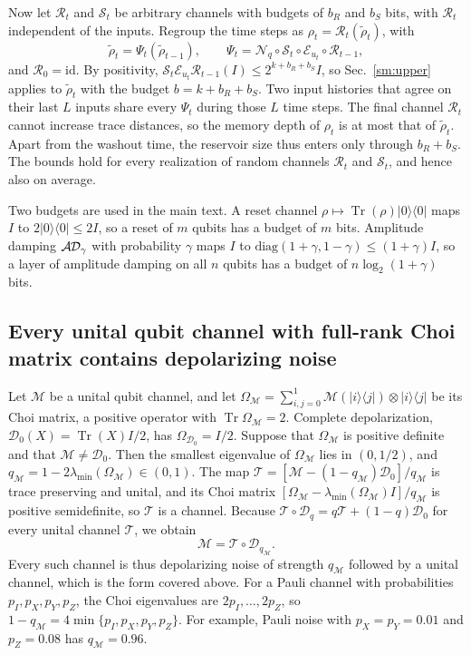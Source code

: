 \documentclass[aps,prl,twocolumn,superscriptaddress,floatfix]{revtex4-2}
\theoremstyle{plain}
\newcommand{\tr}{\operatorname{Tr}}
\newcommand{\ketbra}[2]{|#1\rangle\!\langle #2|}
\newcommand{\cD}{\mathcal D}
\newcommand{\cE}{\mathcal E}
\newcommand{\Nq}{\mathcal N_q}
\newcommand{\AD}{\mathcal{A\hspace{-0.6pt}D}}
\begin{document}
Now let $\mathcal R_t$ and $\mathcal S_t$ be arbitrary channels with budgets of $b_R$ and $b_S$ bits, with $\mathcal R_t$ independent of the inputs. Regroup the time steps as $\rho_t=\mathcal R_t(\tilde\rho_t)$, with
\begin{equation}
\tilde\rho_t=\Psi_t(\tilde\rho_{t-1}),\qquad\Psi_t=\Nq\circ\mathcal S_t\circ\cE_{u_t}\circ\mathcal R_{t-1},
\end{equation}
and $\mathcal R_0=\mathrm{id}$. By positivity, $\mathcal S_t\cE_{u_t}\mathcal R_{t-1}(I)\le2^{k+b_R+b_S}I$, so Sec.~\ref{sm:upper} applies to $\tilde\rho_t$ with the budget $b=k+b_R+b_S$. Two input histories that agree on their last $L$ inputs share every $\Psi_t$ during those $L$ time steps. The final channel $\mathcal R_t$ cannot increase trace distances, so the memory depth of $\rho_t$ is at most that of $\tilde\rho_t$. Apart from the washout time, the reservoir size thus enters only through $b_R+b_S$. The bounds hold for every realization of random channels $\mathcal R_t$ and $\mathcal S_t$, and hence also on average.

Two budgets are used in the main text. A reset channel $\rho\mapsto\tr(\rho)\ketbra00$ maps $I$ to $2\ketbra00\le2I$, so a reset of $m$ qubits has a budget of $m$ bits. Amplitude damping $\AD_\gamma$ with probability $\gamma$ maps $I$ to $\mathrm{diag}(1+\gamma,1-\gamma)\le(1+\gamma)I$, so a layer of amplitude damping on all $n$ qubits has a budget of $n\log_2(1+\gamma)$ bits.

\subsection{Every unital qubit channel with full-rank Choi matrix contains depolarizing noise}

Let $\mathcal M$ be a unital qubit channel, and let $\Omega_{\mathcal M}=\sum_{i,j=0}^1\mathcal M(\ketbra ij)\otimes\ketbra ij$ be its Choi matrix, a positive operator with $\tr\Omega_{\mathcal M}=2$. Complete depolarization, $\cD_0(X)=\tr(X)I/2$, has $\Omega_{\cD_0}=I/2$. Suppose that $\Omega_{\mathcal M}$ is positive definite and that $\mathcal M\ne\cD_0$. Then the smallest eigenvalue of $\Omega_{\mathcal M}$ lies in $(0,1/2)$, and $q_{\mathcal M}=1-2\lambda_{\min}(\Omega_{\mathcal M})\in(0,1)$. The map $\mathcal T=[\mathcal M-(1-q_{\mathcal M})\cD_0]/q_{\mathcal M}$ is trace preserving and unital, and its Choi matrix $[\Omega_{\mathcal M}-\lambda_{\min}(\Omega_{\mathcal M})I]/q_{\mathcal M}$ is positive semidefinite, so $\mathcal T$ is a channel. Because $\mathcal T\circ\cD_q=q\mathcal T+(1-q)\cD_0$ for every unital channel $\mathcal T$, we obtain
\begin{equation}
\mathcal M=\mathcal T\circ\cD_{q_{\mathcal M}} .
\end{equation}
Every such channel is thus depolarizing noise of strength $q_{\mathcal M}$ followed by a unital channel, which is the form covered above. For a Pauli channel with probabilities $p_I,p_X,p_Y,p_Z$, the Choi eigenvalues are $2p_I,\dots,2p_Z$, so $1-q_{\mathcal M}=4\min\{p_I,p_X,p_Y,p_Z\}$. For example, Pauli noise with $p_X=p_Y=0.01$ and $p_Z=0.08$ has $q_{\mathcal M}=0.96$.
\end{document}
